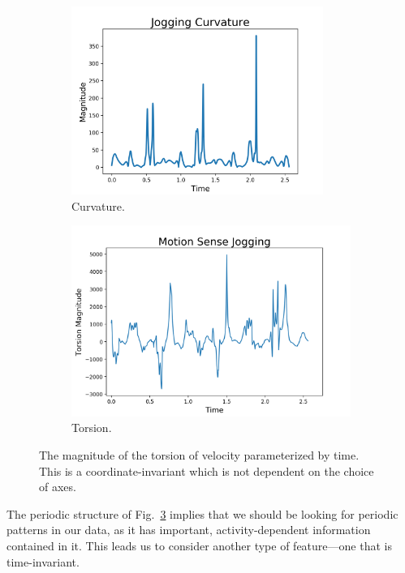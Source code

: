 \begin{figure}[ht]
\begin{subfigure}{.5\textwidth}
  \includegraphics[width = 0.9\textwidth]{images/comparisons/jog_curv.png}
    \caption{Curvature.}
    \label{fig:curv}
\end{subfigure}
\begin{subfigure}{.5\textwidth}
    \includegraphics[width = \textwidth]{images/comparisons/jog_tor.png}
    \caption{Torsion.}
    \label{fig:tor}
\end{subfigure}
\caption{The magnitude of the torsion of velocity parameterized by time. This is a coordinate-invariant which is not dependent on the choice of axes.}
\label{fig:coord_inv}
\end{figure}

The periodic structure of Fig.~\ref{fig:coord_inv} implies that we should be looking for periodic patterns in our data, as it has important, activity-dependent information contained in it. This leads us to consider another type of feature---one that is time-invariant.
	

